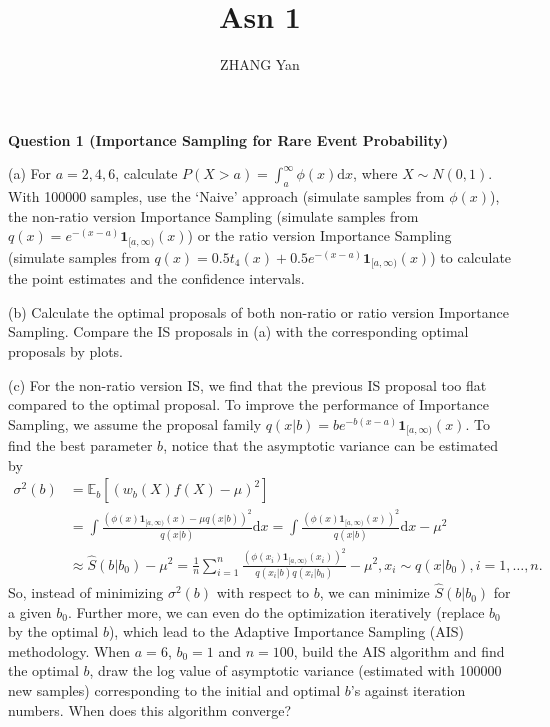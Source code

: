 \documentclass[12pt]{article}
\title{Asn 1}
\author{ZHANG Yan}
\begin{document}
\maketitle

\textbf{Question 1 (Importance Sampling for Rare Event Probability)}

(a) For $a=2, 4, 6$, calculate $P(X>a)=\int_a^\infty\phi(x)\mathrm{d} x$, where $X\sim N(0, 1)$. With 100000 samples, use the `Naive' approach (simulate samples from $\phi(x)$), the non-ratio version Importance Sampling (simulate samples from $q(x)=e^{-(x-a)}\mathbf{1}_{[a,\infty)}(x)$) or the ratio version Importance Sampling (simulate samples from $q(x)=0.5t_4(x)+0.5e^{-(x-a)}\mathbf{1}_{[a,\infty)}(x)$) to calculate the point estimates and the confidence intervals. 

(b) Calculate the optimal proposals of both non-ratio or ratio version Importance Sampling. Compare the IS proposals in (a) with the corresponding optimal proposals by plots. 

(c) For the non-ratio version IS, we find that the previous IS proposal too flat compared to the optimal proposal. To improve the performance of Importance Sampling, we assume the proposal family $q(x|b)=be^{-b(x-a)}\mathbf{1}_{[a,\infty)}(x)$. To find the best parameter $b$, notice that the asymptotic variance can be estimated by
\begin{align*}
\sigma^2(b)&=\mathbb{E}_b[(w_b(X)f(X)-\mu)^2]\\
&=\int\frac{(\phi(x)\mathbf{1}_{[a,\infty)}(x)-\mu q(x|b))^2}{q(x|b)}\mathrm{d}x=\int\frac{(\phi(x)\mathbf{1}_{[a,\infty)}(x))^2}{q(x|b)}\mathrm{d}x-\mu^2\\
&\approx\hat{S}(b|b_0)-\mu^2=\frac{1}{n}\sum_{i=1}^n\frac{(\phi(x_i)\mathbf{1}_{[a,\infty)}(x_i))^2}{q(x_i|b)q(x_i|b_0)}-\mu^2, x_i\sim q(x|b_0), i=1,\dots,n. 
\end{align*}
So, instead of minimizing $\sigma^2(b)$ with respect to $b$, we can minimize $\hat{S}(b|b_0)$ for a given $b_0$. Further more, we can even do the optimization iteratively (replace $b_0$ by the optimal $b$), which lead to the Adaptive Importance Sampling (AIS) methodology. When $a=6$, $b_0=1$ and $n=100$, build the AIS algorithm and find the optimal $b$, draw the log value of asymptotic variance (estimated with 100000 new samples) corresponding to the initial and optimal $b$'s against iteration numbers. When does this algorithm converge? 
\end{document}
